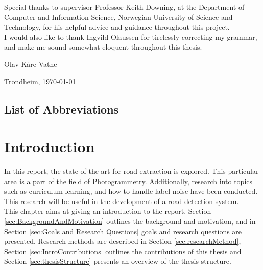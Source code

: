\documentclass[a4paper]{book}
\newcommand{\thesisAuthor}{Olav Kåre Vatne}
\begin{document}
Special thanks to supervisor Professor Keith Downing, at the Department of Computer
and Information Science, Norwegian University of Science and Technology, for his
helpful advice and guidance throughout this project. \\

I would also like to thank Ingvild Olaussen for tirelessly correcting my grammar, and make me sound somewhat eloquent throughout this thesis.


\vfill

\hfill \thesisAuthor

\hfill Trondheim, \today

\clearpage

\section*{List of Abbreviations}
\vspace{1cm}
\begin{acronym}
\end{acronym}



\tableofcontents

\listoffigures

\listoftables


\mainmatter



\chapter{Introduction}
\label{cha:Introduction}
In this report, the state of the art for road extraction is explored. This particular area is a part of the field of Photogrammetry. Additionally, research into topics such as curriculum learning, and how to handle label noise have been conducted. This research will be useful in the development of a road detection system.\\

This chapter aims at giving an introduction to the report. Section \ref{sec:BackgroundAndMotivation} outlines the background and motivation, and in Section \ref{sec:Goals and Research Questions} goals and research questions are presented. Research methods are described in Section \ref{sec:researchMethod}, Section \ref{sec:IntroContributions} outlines the contributions of this thesis and Section \ref{sec:thesisStructure} presents an overview of the thesis structure.
\end{document}
